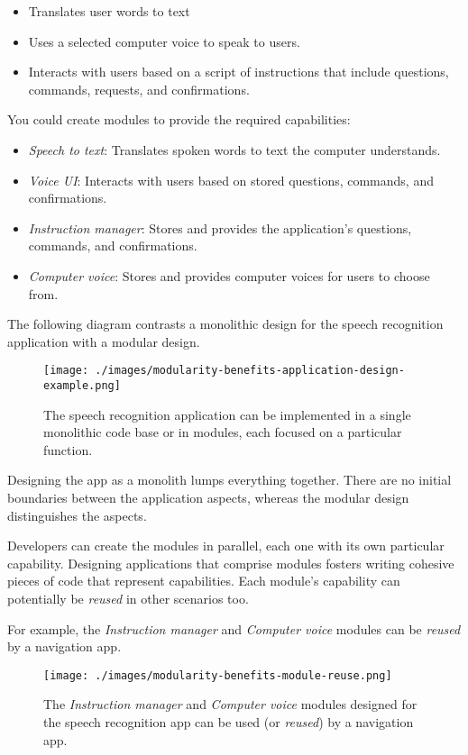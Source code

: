 \begin{itemize}
\tightlist
\item
  Translates user words to text
\item
  Uses a selected computer voice to speak to users.
\item
  Interacts with users based on a script of instructions that include
  questions, commands, requests, and confirmations.
\end{itemize}

You could create modules to provide the required capabilities:

\begin{itemize}
\tightlist
\item
  \emph{Speech to text}: Translates spoken words to text the computer
  understands.
\item
  \emph{Voice UI}: Interacts with users based on stored questions,
  commands, and confirmations.
\item
  \emph{Instruction manager}: Stores and provides the application's
  questions, commands, and confirmations.
\item
  \emph{Computer voice}: Stores and provides computer voices for users
  to choose from.
\end{itemize}

The following diagram contrasts a monolithic design for the speech
recognition application with a modular design.

\begin{figure}
\centering
\texttt{[image: ./images/modularity-benefits-application-design-example.png]}
\caption{The speech recognition application can be implemented in a
single monolithic code base or in modules, each focused on a particular
function.}
\end{figure}

Designing the app as a monolith lumps everything together. There are no
initial boundaries between the application aspects, whereas the modular
design distinguishes the aspects.

Developers can create the modules in parallel, each one with its own
particular capability. Designing applications that comprise modules
fosters writing cohesive pieces of code that represent capabilities.
Each module's capability can potentially be \emph{reused} in other
scenarios too.

For example, the \emph{Instruction manager} and \emph{Computer voice}
modules can be \emph{reused} by a navigation app.

\begin{figure}
\centering
\texttt{[image: ./images/modularity-benefits-module-reuse.png]}
\caption{The \emph{Instruction manager} and \emph{Computer voice}
modules designed for the speech recognition app can be used (or
\emph{reused}) by a navigation app.}
\end{figure}

